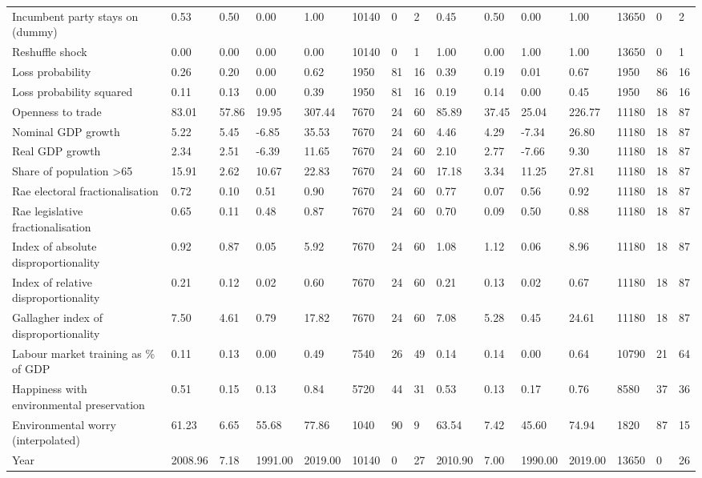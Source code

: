 \begin{longtable}{lllllllllllllll}
Incumbent party stays on (dummy) & 0.53 & 0.50 & 0.00 & 1.00 & 10140 & 0 & 2 & 0.45 & 0.50 & 0.00 & 1.00 & 13650 & 0 & 2\\
Reshuffle shock & 0.00 & 0.00 & 0.00 & 0.00 & 10140 & 0 & 1 & 1.00 & 0.00 & 1.00 & 1.00 & 13650 & 0 & 1\\
\addlinespace
Loss probability & 0.26 & 0.20 & 0.00 & 0.62 & 1950 & 81 & 16 & 0.39 & 0.19 & 0.01 & 0.67 & 1950 & 86 & 16\\
Loss probability squared & 0.11 & 0.13 & 0.00 & 0.39 & 1950 & 81 & 16 & 0.19 & 0.14 & 0.00 & 0.45 & 1950 & 86 & 16\\
Openness to trade & 83.01 & 57.86 & 19.95 & 307.44 & 7670 & 24 & 60 & 85.89 & 37.45 & 25.04 & 226.77 & 11180 & 18 & 87\\
Nominal GDP growth & 5.22 & 5.45 & -6.85 & 35.53 & 7670 & 24 & 60 & 4.46 & 4.29 & -7.34 & 26.80 & 11180 & 18 & 87\\
Real GDP growth & 2.34 & 2.51 & -6.39 & 11.65 & 7670 & 24 & 60 & 2.10 & 2.77 & -7.66 & 9.30 & 11180 & 18 & 87\\
\addlinespace
Share of population >65 & 15.91 & 2.62 & 10.67 & 22.83 & 7670 & 24 & 60 & 17.18 & 3.34 & 11.25 & 27.81 & 11180 & 18 & 87\\
Rae electoral fractionalisation & 0.72 & 0.10 & 0.51 & 0.90 & 7670 & 24 & 60 & 0.77 & 0.07 & 0.56 & 0.92 & 11180 & 18 & 87\\
Rae legislative fractionalisation & 0.65 & 0.11 & 0.48 & 0.87 & 7670 & 24 & 60 & 0.70 & 0.09 & 0.50 & 0.88 & 11180 & 18 & 87\\
Index of absolute disproportionality & 0.92 & 0.87 & 0.05 & 5.92 & 7670 & 24 & 60 & 1.08 & 1.12 & 0.06 & 8.96 & 11180 & 18 & 87\\
Index of relative disproportionality & 0.21 & 0.12 & 0.02 & 0.60 & 7670 & 24 & 60 & 0.21 & 0.13 & 0.02 & 0.67 & 11180 & 18 & 87\\
\addlinespace
Gallagher index of disproportionality & 7.50 & 4.61 & 0.79 & 17.82 & 7670 & 24 & 60 & 7.08 & 5.28 & 0.45 & 24.61 & 11180 & 18 & 87\\
Labour market training as \% of GDP & 0.11 & 0.13 & 0.00 & 0.49 & 7540 & 26 & 49 & 0.14 & 0.14 & 0.00 & 0.64 & 10790 & 21 & 64\\
Happiness with environmental preservation & 0.51 & 0.15 & 0.13 & 0.84 & 5720 & 44 & 31 & 0.53 & 0.13 & 0.17 & 0.76 & 8580 & 37 & 36\\
Environmental worry (interpolated) & 61.23 & 6.65 & 55.68 & 77.86 & 1040 & 90 & 9 & 63.54 & 7.42 & 45.60 & 74.94 & 1820 & 87 & 15\\
Year & 2008.96 & 7.18 & 1991.00 & 2019.00 & 10140 & 0 & 27 & 2010.90 & 7.00 & 1990.00 & 2019.00 & 13650 & 0 & 26\\
\bottomrule
\end{longtable}
